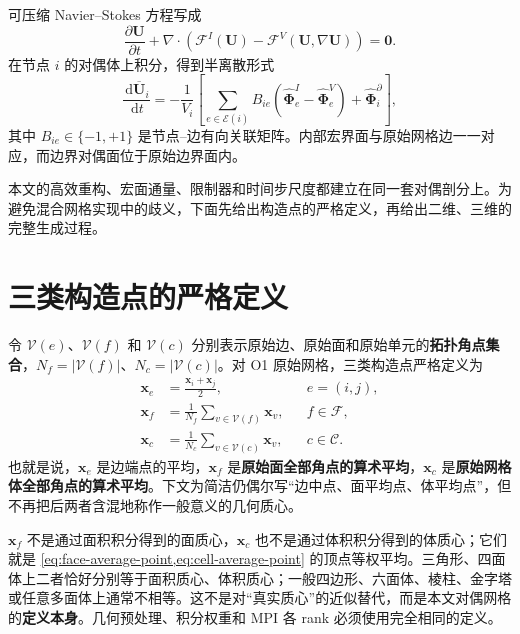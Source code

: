 \documentclass[UTF8,a4paper,11pt,openany]{ctexrep}
\numberwithin{equation}{chapter}
\newcommand{\dd}{\,\mathrm d}
\newcommand{\Ubar}{\overline{\bm U}}
\newcommand{\Flux}{\bm{\mathcal F}}
\newcommand{\grad}{\nabla}
\begin{document}
可压缩 Navier--Stokes 方程写成
\begin{equation}
  \frac{\partial \bm U}{\partial t}
  +\grad\cdot\left(\Flux^{I}(\bm U)-\Flux^{V}(\bm U,\grad\bm U)\right)=\bm 0.
\end{equation}
在节点 $i$ 的对偶体上积分，得到半离散形式
\begin{equation}
  \frac{\dd\Ubar_i}{\dd t}
  =-\frac{1}{V_i}\left[
    \sum_{e\in\mathcal E(i)} B_{ie}
    \left(\widehat{\bm\Phi}^{I}_e-\widehat{\bm\Phi}^{V}_e\right)
    +\widehat{\bm\Phi}^{\partial}_i
  \right],
  \label{eq:semidiscrete}
\end{equation}
其中 $B_{ie}\in\{-1,+1\}$ 是节点--边有向关联矩阵。内部宏界面与原始网格边一一对应，而边界对偶面位于原始边界面内。

本文的高效重构、宏面通量、限制器和时间步尺度都建立在同一套对偶剖分上。为避免混合网格实现中的歧义，下面先给出构造点的严格定义，再给出二维、三维的完整生成过程。

\section{三类构造点的严格定义}

令 $\mathcal V(e)$、$\mathcal V(f)$ 和 $\mathcal V(c)$ 分别表示原始边、原始面和原始单元的\textbf{拓扑角点集合}，$N_f=|\mathcal V(f)|$、$N_c=|\mathcal V(c)|$。对 O1 原始网格，三类构造点严格定义为
\begin{align}
  \bm x_e&=\frac{\bm x_i+\bm x_j}{2},
  &&e=(i,j),\label{eq:edge-average-point}\\
  \bm x_f&=\frac{1}{N_f}\sum_{v\in\mathcal V(f)}\bm x_v,
  &&f\in\mathcal F,\label{eq:face-average-point}\\
  \bm x_c&=\frac{1}{N_c}\sum_{v\in\mathcal V(c)}\bm x_v,
  &&c\in\mathcal C.\label{eq:cell-average-point}
\end{align}
也就是说，$\bm x_e$ 是边端点的平均，$\bm x_f$ 是\textbf{原始面全部角点的算术平均}，$\bm x_c$ 是\textbf{原始网格体全部角点的算术平均}。下文为简洁仍偶尔写“边中点、面平均点、体平均点”，但不再把后两者含混地称作一般意义的几何质心。

\begin{conclusionbox}[必须冻结的几何口径]
$\bm x_f$ 不是通过面积积分得到的面质心，$\bm x_c$ 也不是通过体积积分得到的体质心；它们就是 \cref{eq:face-average-point,eq:cell-average-point} 的顶点等权平均。三角形、四面体上二者恰好分别等于面积质心、体积质心；一般四边形、六面体、棱柱、金字塔或任意多面体上通常不相等。这不是对“真实质心”的近似替代，而是本文对偶网格的\textbf{定义本身}。几何预处理、积分权重和 MPI 各 rank 必须使用完全相同的定义。
\end{conclusionbox}
\end{document}
